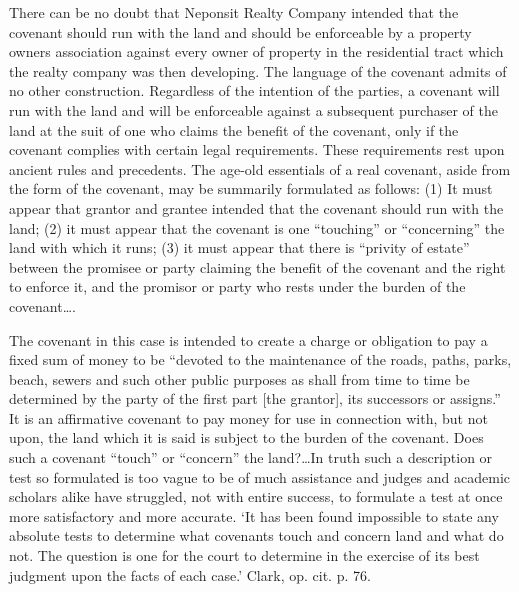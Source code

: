 There can be no doubt that Neponsit Realty Company intended that the covenant
should run with the land and should be enforceable by a property owners
association against every owner of property in the residential tract which the
realty company was then developing. The language of the covenant admits of no
other construction. Regardless of the intention of the parties, a covenant will
run with the land and will be enforceable against a subsequent purchaser of the
land at the suit of one who claims the benefit of the covenant, only if the
covenant complies with certain legal requirements. These requirements rest upon
ancient rules and precedents. The age-old essentials of a real covenant, aside
from the form of the covenant, may be summarily formulated as follows: (1) It
must appear that grantor and grantee intended that the covenant should run with
the land; (2) it must appear that the covenant is one ``touching'' or
``concerning'' the land with which it runs; (3) it must appear that there is
``privity of estate'' between the promisee or party claiming the benefit of the
covenant and the right to enforce it, and the promisor or party who rests under
the burden of the covenant\ldots .

The covenant in this case is intended to create a charge or obligation to pay a
fixed sum of money to be ``devoted to the maintenance of the roads, paths, parks,
beach, sewers and such other public purposes as shall from time to time be
determined by the party of the first part [the grantor], its successors or
assigns.'' It is an affirmative covenant to pay money for use in connection with,
but not upon, the land which it is said is subject to the burden of the
covenant. Does such a covenant ``touch'' or ``concern'' the land?\ldots In truth
such a description or test so formulated is too vague to be of much assistance
and judges and academic scholars alike have struggled, not with entire success,
to formulate a test at once more satisfactory and more accurate. `It has been
found impossible to state any absolute tests to determine what covenants touch
and concern land and what do not. The question is one for the court to determine
in the exercise of its best judgment upon the facts of each case.' Clark, op.
cit. p. 76.

